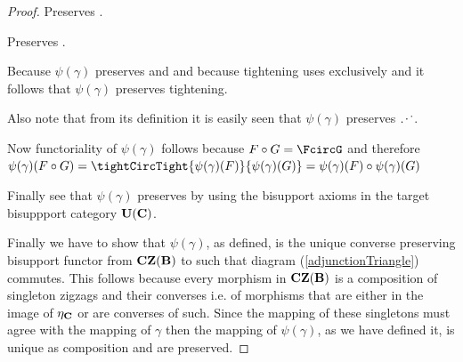 \begin{proof}
Preserves \rstItself.

Preserves \rngItself.

Because $\psi(\gamma)$ preserves \rstItself and \rngItself and because
tightening uses exclusively  \rstItself and \rngItself it follows that
$\psi(\gamma)$ preserves tightening.

Also note that from its definition 
it is easily seen that $\psi(\gamma)$  preserves $\cnc$.

Now functoriality of $\psi(\gamma)$ follows because
$F \circ G = \FcircG$ and therefore $\psi(\gamma)(F \circ G)
=\tightCircTight{{\psi(\gamma)(F)}}{\psi(\gamma)(G)}
= \psi(\gamma)(F)\circ \psi(\gamma)(G)$

Finally see that $\psi(\gamma)$ preserves \converseItself 
by using the bisupport axioms in the target bisuppport category $\textbf{U}(\textbf{C})$.

Finally we have to show that $\psi(\gamma)$, as defined, is the unique 
converse preserving bisupport functor from $\textbf{CZ}(\textbf{B})$ to \catcw 
such that diagram (\ref{adjunctionTriangle}) commutes. This follows
because every morphism in $\textbf{CZ}(\textbf{B})$ is a composition 
of singleton zigzags and their converses i.e. of morphisms that are either
in the image of $\eta_{\textbf{C}}$ or are converses of such. Since the mapping of these singletons must agree with the mapping of $\gamma$ then the mapping of
$\psi(\gamma)$, as we have defined it, is unique as composition and \converseItself are preserved.  

\end{proof}
